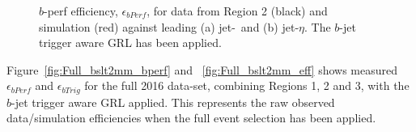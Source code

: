 \begin{figure}[!ht]
\begin{center}
  \end{center}
  \caption{$b$-perf efficiency, $\epsilon_{bPerf}$, for data from Region 2 (black) and simulation (red) against leading (a) jet-\pT~and (b) jet-$\eta$.
    The $b$-jet trigger aware GRL has been applied.}
  \label{fig:Epoch2_bslt2mm_bperf}
\end{figure}

\newpage

Figure~\ref{fig:Full_bslt2mm_bperf} and ~\ref{fig:Full_bslt2mm_eff} shows measured
$\epsilon_{bPerf}$ and $\epsilon_{bTrig}$
for the full 2016 data-set, combining Regions 1, 2 and 3,
with the $b$-jet trigger aware GRL applied.
This represents the raw observed data/simulation efficiencies when the full event selection has been applied.

\begin{figure}[!ht]
  \begin{center}
    \captionsetup[subfigure]{aboveskip=0pt,justification=centering}
    \\

\end{center}
\end{figure}
